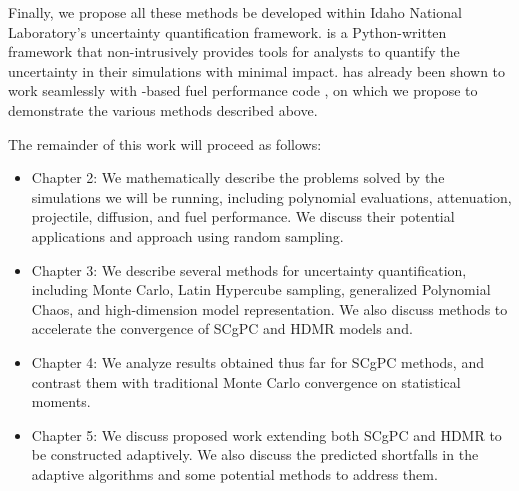 Finally, we propose all these methods be developed within Idaho National Laboratory's \raven{}\cite{raven}
uncertainty quantification framework. \raven{} is a Python-written framework that non-intrusively provides
tools for analysts to quantify the uncertainty in their simulations with minimal impact. \raven{}  has already
been shown to work seamlessly with \moose{}-based fuel performance code \bison{}\cite{moose}\cite{bison}, on which we propose to demonstrate the various
methods described above.

The remainder of this work will proceed as follows:
\begin{itemize}
  \item Chapter 2: We mathematically describe the problems solved by the simulations we will be running,
    including polynomial evaluations, attenuation, projectile, diffusion, and fuel performance.  We discuss
    their potential applications and approach using random sampling.
  \item Chapter 3: We describe several methods for uncertainty quantification, including Monte Carlo, Latin
    Hypercube sampling, generalized Polynomial Chaos, and high-dimension model representation.  We also
    discuss methods to accelerate the convergence of SCgPC and HDMR models and.
  \item Chapter 4: We analyze results obtained thus far for SCgPC methods, and contrast them with traditional
    Monte Carlo convergence on statistical moments.
  \item Chapter 5: We discuss proposed work extending both SCgPC and HDMR to be constructed adaptively.  We
    also discuss the predicted shortfalls in the adaptive algorithms and some potential methods to address
    them.
\end{itemize}
